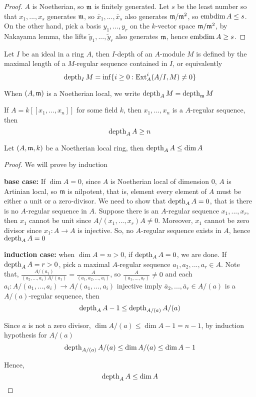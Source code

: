 \begin{proof}
	$A$ is Noetherian, so $\mathfrak{m}$ is finitely generated. Let $s$ be the least number so that $x_1, ..., x_s$ generates $\mathfrak{m}$, so $\bar{x}_1, ..., \bar{x}_s$ also generates $\mathfrak{m} / \mathfrak{m}^2$, so $\operatorname{embdim} A \leq s$. On the other hand, pick a basis $y_1, ..., y_r$ on the $k$-vector space $\mathfrak{m} / \mathfrak{m}^2$, by Nakayama lemma, the lifts $\tilde{y}_1, ..., \tilde{y}_r$ also generates $\mathfrak{m}$, hence $\operatorname{embdim} A \geq s$.
	
	
\end{proof}

\begin{definition}[$I$-depth]
	Let $I$ be an ideal in a ring $A$, then $I$-depth of an $A$-module $M$ is defined by the maximal length of a $M$-regular sequence contained in $I$, or equivalently
	$$
		\operatorname{depth}_I M = \inf \{i \geq 0: \operatorname{Ext}_A^i(A / I, M) \neq 0\}
	$$
	
	When $(A, \mathfrak{m})$ is a Noetherian local, we write $\operatorname{depth}_A M = \operatorname{depth}_{\mathfrak{m}} M$
\end{definition}

\begin{remark}
	If $A = k[[x_1, ..., x_n]]$ for some field $k$, then $x_1, ..., x_n$ is a $A$-regular sequence, then
	$$
		\operatorname{depth}_A A \geq n
	$$
\end{remark}

\begin{theorem}
	Let $(A, \mathfrak{m}, k)$ be a Noetherian local ring, then $\operatorname{depth}_A A \leq \dim A$
\end{theorem}

\begin{proof}
	We will prove by induction
	
	\textbf{base case:} If $\dim A = 0$, since $A$ is Noetherian local of dimension $0$, $A$ is Artinian local, so $\mathfrak{m}$ is nilpotent, that is, element every element of $A$ must be either a unit or a zero-divisor. We need to show that $\operatorname{depth}_A A = 0$, that is there is no $A$-regular sequence in $A$. Suppose there is an  $A$-regular sequence $x_1, ..., x_r$, then $x_1$ cannot be unit since $A / (x_1, ..., x_r) A \neq 0$. Moreover, $x_1$ cannot be zero divisor since $x_1: A \to A$ is injective. So, no $A$-regular sequence exists in $A$, hence $\operatorname{depth}_A A = 0$
	
	\textbf{induction case:} when $\dim A = n > 0$, if $\operatorname{depth}_A A = 0$, we are done. If $\operatorname{depth}_A A = r > 0$, pick a maximal $A$-regular sequence $a_1, a_2, ..., a_r \in A$. Note that, $\frac{A / (a_1)}{(a_2, ..., a_i) A / (a_1)} = \frac{A}{(a_1, a_2, ..., a_i)}$, so $\frac{A}{(a_1, ..., a_r)}\neq 0$ and each $a_i: A / (a_1, ..., a_i) \to A / (a_1, ..., a_i)$ injective imply $\bar{a}_2, ..., \bar{a}_r \in A / (a)$ is a $A / (a)$-regular sequence, then
	$$
	\operatorname{depth}_A A - 1 \leq \operatorname{depth}_{A / (a)} A / (a)
	$$
	
	Since $a$ is not a zero divisor, $\dim A / (a) \leq \dim A - 1 = n-1$, by induction hypothesis for $A / (a)$
	$$
	\operatorname{depth}_{A / (a)} A / (a) \leq \dim A / (a) \leq \dim A - 1 
	$$
	
	Hence, 
	$$
	\operatorname{depth}_A A \leq \dim A
	$$
\end{proof}

